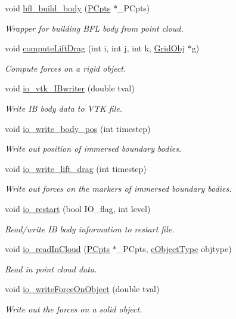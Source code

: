 \begin{DoxyCompactItemize}
void \hyperlink{class_object_manager_a56c65bd5122aa7e7026fb8d2315482f3}{bfl\+\_\+build\+\_\+body} (\hyperlink{class_p_cpts}{P\+Cpts} $\ast$\+\_\+\+P\+Cpts)
\begin{DoxyCompactList}\small\item\em Wrapper for building B\+FL body from point cloud. \end{DoxyCompactList}\item 
void \hyperlink{class_object_manager_a6a35b34d77e7cd56060a6953d0d0860a}{compute\+Lift\+Drag} (int i, int j, int k, \hyperlink{class_grid_obj}{Grid\+Obj} $\ast$g)
\begin{DoxyCompactList}\small\item\em Compute forces on a rigid object. \end{DoxyCompactList}\item 
void \hyperlink{class_object_manager_a39aa351c7b338473be4871111da5c5bd}{io\+\_\+vtk\+\_\+\+I\+Bwriter} (double tval)
\begin{DoxyCompactList}\small\item\em Write IB body data to V\+TK file. \end{DoxyCompactList}\item 
void \hyperlink{class_object_manager_a1f9a40c58bdb3bd9797f7c44864835ec}{io\+\_\+write\+\_\+body\+\_\+pos} (int timestep)
\begin{DoxyCompactList}\small\item\em Write out position of immersed boundary bodies. \end{DoxyCompactList}\item 
void \hyperlink{class_object_manager_ab46e89c9eaf8ca1c9ec264545f39cd7f}{io\+\_\+write\+\_\+lift\+\_\+drag} (int timestep)
\begin{DoxyCompactList}\small\item\em Write out forces on the markers of immersed boundary bodies. \end{DoxyCompactList}\item 
void \hyperlink{class_object_manager_aaa1b7e2a3392c2a8d85606041b986b4d}{io\+\_\+restart} (bool I\+O\+\_\+flag, int level)
\begin{DoxyCompactList}\small\item\em Read/write IB body information to restart file. \end{DoxyCompactList}\item 
void \hyperlink{class_object_manager_a5c11d747c3df9e91d5fc2dac836d7b7e}{io\+\_\+read\+In\+Cloud} (\hyperlink{class_p_cpts}{P\+Cpts} $\ast$\+\_\+\+P\+Cpts, \hyperlink{_object_manager_8h_a7b78fa3db30dfb9c1efc82bf886fe184}{e\+Object\+Type} objtype)
\begin{DoxyCompactList}\small\item\em Read in point cloud data. \end{DoxyCompactList}\item 
void \hyperlink{class_object_manager_adf65260d81584613fa33f2e7658f1b36}{io\+\_\+write\+Force\+On\+Object} (double tval)
\begin{DoxyCompactList}\small\item\em Write out the forces on a solid object. \end{DoxyCompactList}\end{DoxyCompactItemize}
